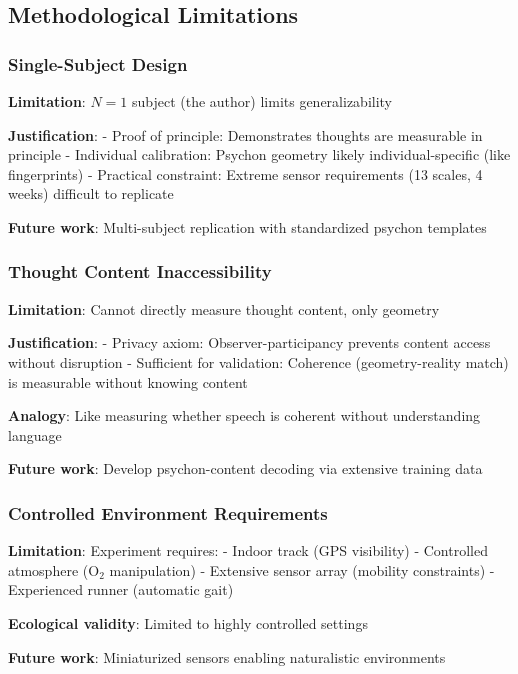 \documentclass[11pt,onecolumn]{article}
\begin{document}
\subsection{Methodological Limitations}

\subsubsection{Single-Subject Design}

\textbf{Limitation}: $N = 1$ subject (the author) limits generalizability

\textbf{Justification}: 
- Proof of principle: Demonstrates thoughts are measurable in principle
- Individual calibration: Psychon geometry likely individual-specific (like fingerprints)
- Practical constraint: Extreme sensor requirements (13 scales, 4 weeks) difficult to replicate

\textbf{Future work}: Multi-subject replication with standardized psychon templates

\subsubsection{Thought Content Inaccessibility}

\textbf{Limitation}: Cannot directly measure thought content, only geometry

\textbf{Justification}:
- Privacy axiom: Observer-participancy prevents content access without disruption
- Sufficient for validation: Coherence (geometry-reality match) is measurable without knowing content

\textbf{Analogy}: Like measuring whether speech is coherent without understanding language

\textbf{Future work}: Develop psychon-content decoding via extensive training data

\subsubsection{Controlled Environment Requirements}

\textbf{Limitation}: Experiment requires:
- Indoor track (GPS visibility)
- Controlled atmosphere (O$_2$ manipulation)
- Extensive sensor array (mobility constraints)
- Experienced runner (automatic gait)

\textbf{Ecological validity}: Limited to highly controlled settings

\textbf{Future work}: Miniaturized sensors enabling naturalistic environments
\end{document}
